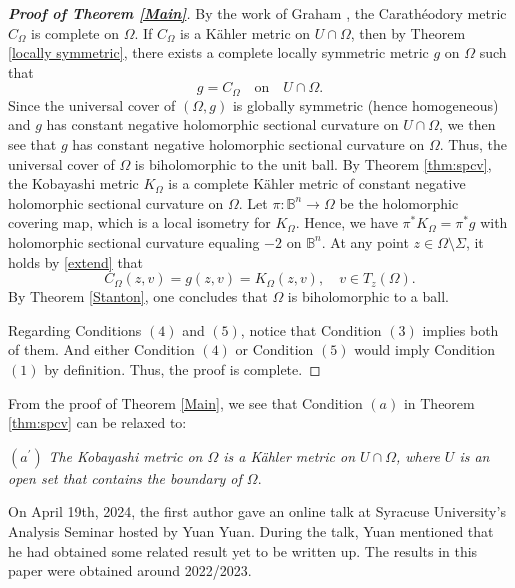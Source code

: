 \documentclass[12pt] {article}
\numberwithin{equation}{section}
\begin{document}
\begin{proof}  [{\bf Proof of Theorem \ref{Main}}]
By the work of Graham \cite[Proposition 5]{G}, the Carath\'eodory metric $C_\Omega$ is complete on $\Omega$. 
If $C_\Omega$ is a K\"ahler metric on $U \cap \Omega$,    then by 
Theorem \ref{locally symmetric},
 there exists a complete 
  locally symmetric metric ${g}$ on $\Omega$ such that 
\begin{equation} \label{extend}
{g} = C_\Omega \quad \text{on} \quad U \cap \Omega.
\end{equation}
Since the universal cover of $(\Omega, {g})$ is globally symmetric (hence homogeneous) and ${g}$ has constant negative holomorphic sectional curvature on $U \cap \Omega$, we then see that ${g}$ has constant negative holomorphic sectional curvature on $\Omega$. 
  Thus,   the universal cover of $\Omega$ is biholomorphic to the unit ball.
By Theorem \ref{thm:spcv}, the Kobayashi metric $K_\Omega$ is  a complete K\"ahler metric of constant negative holomorphic sectional curvature on $\Omega$. Let $\pi: \mathbb{B}^n \rightarrow \Omega$ be the holomorphic covering map, which is a local isometry for $K_\Omega$.
Hence, we have $\pi^*K_{\Omega} = \pi^* {g}$ with holomorphic sectional curvature equaling $-2$ on $\mathbb{B}^n$. At any point $z\in \Omega \setminus \Sigma$,  it holds by \eqref{extend} that
$$ 
 {C_{\Omega}(z, v)} = { {g}(z, v)} = {K_{\Omega}(z, v)}, \quad  v\in T_z(\Omega).
$$
By Theorem \ref{Stanton}, one concludes that $\Omega$ is biholomorphic to a ball.


\medskip

Regarding Conditions $(4)$ and $(5)$, notice that Condition $(3)$ implies both of them. And either Condition $(4)$ or Condition $(5)$ would imply Condition $(1)$ by definition. Thus, the proof is complete.


\end{proof}


\medskip
 
From the proof of Theorem \ref{Main}, we see that Condition $(a)$ in Theorem \ref{thm:spcv} can be relaxed to:

\medskip

$(a^{\prime})$ {\it The Kobayashi metric on $\Omega$ is a K\"ahler metric on $U \cap \Omega$, where $U$ is an open set that contains the boundary of $\Omega$}.\\

 


\bigskip

 {\normalsize On April 19th, 2024, the first author gave an online talk at Syracuse University's Analysis Seminar hosted by Yuan Yuan.  
During the talk, Yuan mentioned that he had obtained some related  result yet to be written up.
The results in this paper were obtained around  2022/2023.}\\
\end{document}
